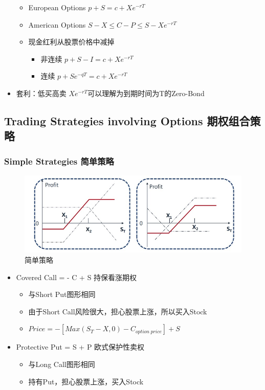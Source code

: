 \documentclass[a4paper,6pt,twoside,openany]{article}
\begin{document}
\begin{itemize}
\begin{itemize}
  \item European Options $p + S = c + Xe^{-rT}$
  \item American Options $S - X \le C - P \le S - Xe^{-rT}$
  \item 现金红利从股票价格中减掉
    \begin{itemize}
    \item 非连续 $p + S - I = c + Xe^{-rT}$
    \item 连续 $p + Se^{-qT} = c + Xe^{-rT}$
    \end{itemize}
  \end{itemize}
  \item 套利：低买高卖 $Xe^{-rT}$可以理解为到期时间为T的Zero-Bond
\end{itemize}

\subsection{Trading Strategies involving Options 期权组合策略}
\subsubsection{Simple Strategies 简单策略}
\begin{figure}[!htbp]
  \centering \includegraphics[width=150mm]{Strategy_Simple.jpg}
  \caption{简单策略}
\end{figure}
\begin{itemize}
\item Covered Call = - C + S 持保看涨期权
  \begin{itemize}
  \item 与Short Put图形相同
  \item 由于Short Call风险很大，担心股票上涨，所以买入Stock
  \item $Price = -[Max(S_T - X,0) - C_{option\ price}] + S$
  \end{itemize}
\item Protective Put = S + P 欧式保护性卖权
  \begin{itemize}
  \item 与Long Call图形相同
  \item 持有Put，担心股票上涨，买入Stock
  \end{itemize}
\end{itemize}
\end{document}
